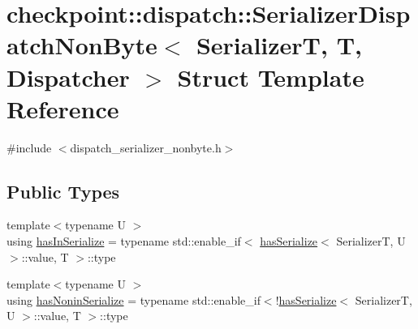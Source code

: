 \hypertarget{structcheckpoint_1_1dispatch_1_1_serializer_dispatch_non_byte}{}\section{checkpoint\+:\+:dispatch\+:\+:Serializer\+Dispatch\+Non\+Byte$<$ SerializerT, T, Dispatcher $>$ Struct Template Reference}
\label{structcheckpoint_1_1dispatch_1_1_serializer_dispatch_non_byte}


{\ttfamily \#include $<$dispatch\+\_\+serializer\+\_\+nonbyte.\+h$>$}

\subsection*{Public Types}
\begin{DoxyCompactItemize}
\item 
{\footnotesize template$<$typename U $>$ }\\using \hyperlink{structcheckpoint_1_1dispatch_1_1_serializer_dispatch_non_byte_a7f2203710503e6ea7a5c4a565795a1d0}{has\+In\+Serialize} = typename std\+::enable\+\_\+if$<$ \hyperlink{structcheckpoint_1_1dispatch_1_1has_serialize}{has\+Serialize}$<$ SerializerT, U $>$\+::value, T $>$\+::type
\item 
{\footnotesize template$<$typename U $>$ }\\using \hyperlink{structcheckpoint_1_1dispatch_1_1_serializer_dispatch_non_byte_ad59e5c933a762ce90d1ab5f7ca04ca9f}{has\+Nonin\+Serialize} = typename std\+::enable\+\_\+if$<$!\hyperlink{structcheckpoint_1_1dispatch_1_1has_serialize}{has\+Serialize}$<$ SerializerT, U $>$\+::value, T $>$\+::type
\end{DoxyCompactItemize}
